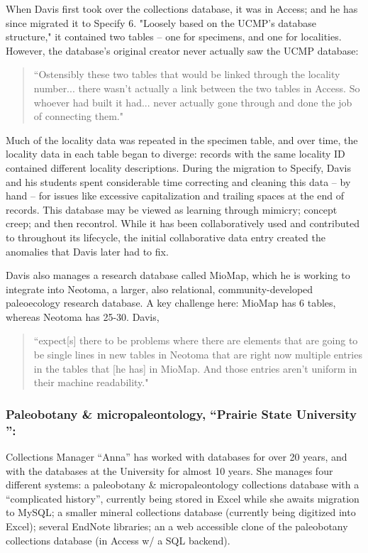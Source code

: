 When Davis first took over the collections database, it was in Access; and he has since migrated it to Specify 6. "Loosely based on the UCMP's database structure," it contained two tables – one for specimens, and one for localities. However, the database’s original creator never actually saw the UCMP database:
\begin{quote}
“Ostensibly these two tables that would be linked through the locality number... there wasn't actually a link between the two tables in Access. So whoever had built it had... never actually gone through and done the job of connecting them."
\end{quote}
Much of the locality data was repeated in the specimen table, and over time, the locality data in each table began to diverge: records with the same locality ID contained different locality descriptions. During the migration to Specify, Davis and his students spent considerable time correcting and cleaning this data – by hand – for issues like excessive capitalization and trailing spaces at the end of records.  This database may be viewed as learning through mimicry; concept creep; and then recontrol. While it has been collaboratively used and contributed to throughout its lifecycle, the initial collaborative data entry created the anomalies that Davis later had to fix.

Davis also manages a research database called MioMap, which he is working to integrate into Neotoma, a larger, also relational, community-developed paleoecology research database. A key challenge here: MioMap has 6 tables, whereas Neotoma has 25-30. Davis, 
\begin{quote}
“expect[s] there to be problems where there are elements that are going to be single lines in new tables in Neotoma that are right now multiple entries in the tables that [he has] in MioMap. And those entries aren't uniform in their machine readability."  
\end{quote}




\subsubsection{Paleobotany & micropaleontology, “Prairie State University ”:}
 Collections Manager “Anna” has worked with databases for over 20 years, and with the databases at the University for almost 10 years.  She manages four different systems: a paleobotany & micropaleontology collections database with a “complicated history”, currently being stored in Excel while she awaits migration to MySQL; a smaller mineral collections database (currently being digitized into Excel); several EndNote libraries; an a web accessible clone of the paleobotany collections database (in Access w/ a SQL backend).

